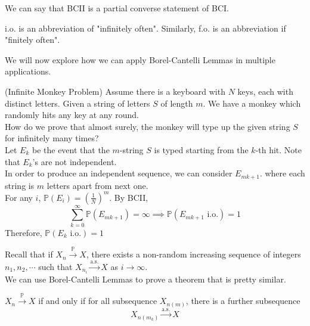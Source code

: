 \documentclass{huhtakm-template-book}
\newcommand{\prob}{\mathbb{P}}
\begin{document}
\begin{rem}
	We can say that BCII is a partial converse statement of BCI.
\end{rem}
\begin{rem}
	i.o. is an abbreviation of "infinitely often". Similarly, f.o. is an abbreviation if "finitely often".
\end{rem}
We will now explore how we can apply Borel-Cantelli Lemmas in multiple applications.
\begin{eg}(Infinite Monkey Problem)
	Assume there is a keyboard with $N$ keys, each with distinct letters. Given a string of letters $S$ of length $m$. We have a monkey which randomly hits any key at any round.\\
	How do we prove that almost surely, the monkey will type up the given string $S$ for infinitely many times?\\
	Let $E_{k}$ be the event that the $m$-string $S$ is typed starting from the $k$-th hit. Note that $E_{k}$'s are not independent.\\
	In order to produce an independent sequence, we can consider $E_{mk+1}$. where each string is $m$ letters apart from next one.\\
	For any $i$, $\prob(E_{i})=\left(\frac{1}{N}\right)^{m}$. By BCII,
	\begin{equation*}
		\sum_{k=0}^{\infty}\prob(E_{mk+1})=\infty\implies\prob(E_{mk+1}\text{ i.o.})=1
	\end{equation*}
	Therefore, $\prob(E_{k}\text{ i.o.})=1$
\end{eg}
\newpage
Recall that if $X_{n}\xrightarrow{\prob}X$, there exists a non-random increasing sequence of integers $n_{1},n_{2},\cdots$ such that $X_{n_{i}}\xrightarrow{\text{a.s.}}X$ as $i\to\infty$.\\
We can use Borel-Cantelli Lemmas to prove a theorem that is pretty similar.
\begin{thm}
	$X_{n}\xrightarrow{\prob}X$ if and only if for all subsequence $X_{n(m)}$, there is a further subsequence
	\begin{equation*}
		X_{n(m_{k})}\xrightarrow{\text{a.s.}}X
	\end{equation*}
\end{thm}
\end{document}
